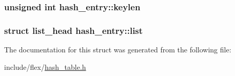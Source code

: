 \subsubsection[{\texorpdfstring{keylen}{keylen}}]{\setlength{\rightskip}{0pt plus 5cm}unsigned int hash\+\_\+entry\+::keylen}\hypertarget{structhash__entry_a6f87c5657a590b7a848cc3f9a1d30d13}{}\label{structhash__entry_a6f87c5657a590b7a848cc3f9a1d30d13}
\subsubsection[{\texorpdfstring{list}{list}}]{\setlength{\rightskip}{0pt plus 5cm}struct {\bf list\+\_\+head} hash\+\_\+entry\+::list}\hypertarget{structhash__entry_ada52d1b11e544cd19b58007cc3713069}{}\label{structhash__entry_ada52d1b11e544cd19b58007cc3713069}


The documentation for this struct was generated from the following file\+:\begin{DoxyCompactItemize}
\item 
include/flex/\hyperlink{include_2flex_2hash__table_8h}{hash\+\_\+table.\+h}\end{DoxyCompactItemize}
